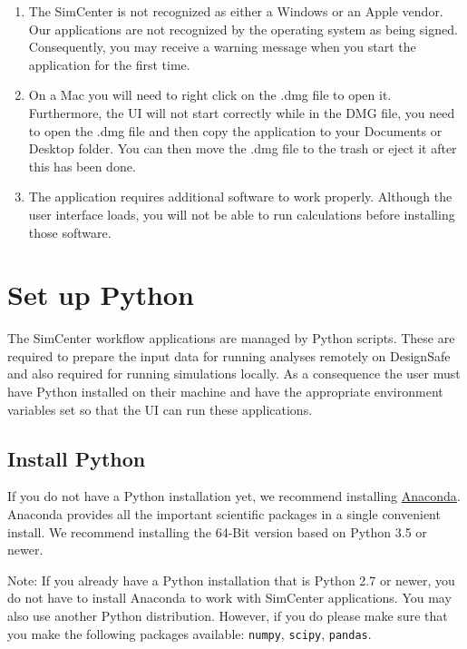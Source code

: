 \begin{enumerate}
\item The SimCenter is not recognized as either a Windows or an Apple vendor. Our applications are not recognized by the operating system as being signed. Consequently, you may receive a warning message when you start the \texttt{\getsoftwarename{}} application for the first time.
\item  On a Mac you will need to right click on the .dmg file to open it. Furthermore, the UI will not start correctly while in the DMG file, you need to open the .dmg file and then copy the \texttt{\getsoftwarename{}} application to your Documents or Desktop folder. You can then move the .dmg file to the trash or eject it after this has been done.
\item  The \texttt{\getsoftwarename{}} application requires additional software to work properly. Although the user interface loads, you will not be able to run calculations before installing those software.
\end{enumerate}



\section{Set up Python}

The SimCenter workflow applications are managed by Python
scripts. These are required to prepare the input data for running
analyses remotely on DesignSafe and also required for running
simulations locally. As a consequence the user must have Python
installed on their machine and have the appropriate environment
variables set so that the UI can run these applications.

\subsection{Install Python}

If you do not have a Python installation yet, we recommend
installing \href{http://www.anaconda.com/distribution/#download-section}{Anaconda}. Anaconda
provides all the important scientific packages in a single convenient
install. We recommend installing the 64-Bit version based on Python
3.5 or newer.

Note: If you already have a Python installation that is Python 2.7 or
newer, you do not have to install Anaconda to work with SimCenter
applications. You may also use another Python distribution. However,
if you do please make sure that you make the following packages
available: \texttt{numpy}, \texttt{scipy}, \texttt{pandas}.

